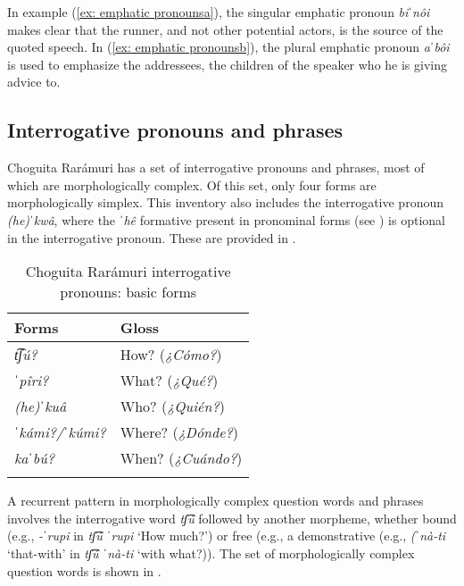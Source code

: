 In example (\ref{ex: emphatic pronounsa}), the singular emphatic pronoun \textit{biˈnôi} makes clear that the runner, and not other potential actors, is the source of the quoted speech. In (\ref{ex: emphatic pronounsb}), the  plural emphatic pronoun \textit{aˈbôi} is used to emphasize the addressees, the children of the speaker who he is giving advice to.

\subsection{Interrogative pronouns and phrases}
\label{subsec: interrogative pronouns}


Choguita Rarámuri has a set of interrogative pronouns and phrases, most of which are morphologically complex.  Of this set, only four forms are morphologically simplex. This inventory also includes the interrogative pronoun \textit{(he)ˈkwâ}, where the \textit{ˈhê} formative present in pronominal forms (see ) is optional in the interrogative pronoun. These are provided in .

\begin{table}
\caption{Choguita Rarámuri interrogative pronouns: basic forms}
\label{tab:interrogative-pronouns}

\begin{tabularx}{.5\textwidth}{ll}
\lsptoprule
\textbf{Forms}  & \textbf{Gloss} \\
\midrule
\textit{t͡ʃú?} & How? (\textit{¿Cómo?})\\
\textit{ˈpîri?}  & What? (\textit{¿Qué?})\\
\textit{(he)ˈkuâ} & Who? (\textit{¿Quién?})\\
\textit{ˈkámi?/ˈkúmi?}  & Where? (\textit{¿Dónde?})\\
\textit{kaˈbú?} & When? (\textit{¿Cuándo?})\\
\lspbottomrule
\end{tabularx}
\end{table}

\hspace*{-4pt}A recurrent pattern in morphologically complex question words and phrases involves the interrogative word \textit{tʃ͡ú} followed by another morpheme, whether bound (e.g., \textit{-ˈrupi} in \textit{tʃ͡ú ˈrupi} `How much?') or free (e.g.,  a demonstrative (e.g., \textit{(ˈnà-ti} `that-with' in \textit{tʃ͡ú ˈnà-ti} `with what?)). The set of morphologically complex question words is shown in .


